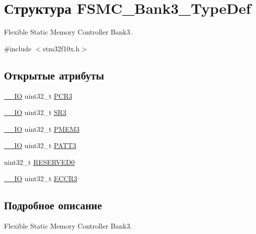 \hypertarget{struct_f_s_m_c___bank3___type_def}{}\section{Структура F\+S\+M\+C\+\_\+\+Bank3\+\_\+\+Type\+Def}
\label{struct_f_s_m_c___bank3___type_def}


Flexible Static Memory Controller Bank3.  




{\ttfamily \#include $<$stm32f10x.\+h$>$}

\subsection*{Открытые атрибуты}
\begin{DoxyCompactItemize}
\item 
\mbox{\hyperlink{group___c_m_s_i_s___c_m3__core__definitions_gaec43007d9998a0a0e01faede4133d6be}{\+\_\+\+\_\+\+IO}} uint32\+\_\+t \mbox{\hyperlink{struct_f_s_m_c___bank3___type_def_a1f772e1028641cab7b923bf02115b919}{P\+C\+R3}}
\item 
\mbox{\hyperlink{group___c_m_s_i_s___c_m3__core__definitions_gaec43007d9998a0a0e01faede4133d6be}{\+\_\+\+\_\+\+IO}} uint32\+\_\+t \mbox{\hyperlink{struct_f_s_m_c___bank3___type_def_ab89f16f64018a1f1e55d36f92b84be94}{S\+R3}}
\item 
\mbox{\hyperlink{group___c_m_s_i_s___c_m3__core__definitions_gaec43007d9998a0a0e01faede4133d6be}{\+\_\+\+\_\+\+IO}} uint32\+\_\+t \mbox{\hyperlink{struct_f_s_m_c___bank3___type_def_a756258d9266b1eee3455bc850107beb6}{P\+M\+E\+M3}}
\item 
\mbox{\hyperlink{group___c_m_s_i_s___c_m3__core__definitions_gaec43007d9998a0a0e01faede4133d6be}{\+\_\+\+\_\+\+IO}} uint32\+\_\+t \mbox{\hyperlink{struct_f_s_m_c___bank3___type_def_a0cbf1b4647f98914238202828de47416}{P\+A\+T\+T3}}
\item 
uint32\+\_\+t \mbox{\hyperlink{struct_f_s_m_c___bank3___type_def_a2e9cac528ee7bfce11b0b9a36db3b954}{R\+E\+S\+E\+R\+V\+E\+D0}}
\item 
\mbox{\hyperlink{group___c_m_s_i_s___c_m3__core__definitions_gaec43007d9998a0a0e01faede4133d6be}{\+\_\+\+\_\+\+IO}} uint32\+\_\+t \mbox{\hyperlink{struct_f_s_m_c___bank3___type_def_a6935beb5bbc2de668024c1989eecd46c}{E\+C\+C\+R3}}
\end{DoxyCompactItemize}


\subsection{Подробное описание}
Flexible Static Memory Controller Bank3. 

